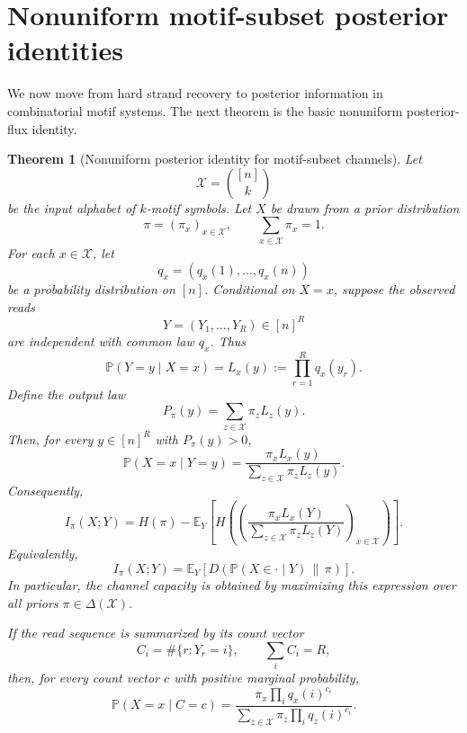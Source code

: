 \documentclass[11pt]{article}
\newtheorem{theorem}{Theorem}
\theoremstyle{definition}
\theoremstyle{remark}
\newcommand{\E}{\mathbb E}
\newcommand{\Pbb}{\mathbb P}
\newcommand{\1}{\mathbf 1}
\begin{document}
\section{Nonuniform motif-subset posterior identities}

We now move from hard strand recovery to posterior information in combinatorial motif systems.  The next theorem is the basic nonuniform posterior-flux identity.

\begin{theorem}[Nonuniform posterior identity for motif-subset channels]\label{thm:posterior-identity}
Let
\[
  \mathcal X=\binom{[n]}{k}
\]
be the input alphabet of \(k\)-motif symbols.  Let \(X\) be drawn from a prior distribution
\[
  \pi=(\pi_x)_{x\in\mathcal X},\qquad \sum_{x\in\mathcal X}\pi_x=1.
\]
For each \(x\in\mathcal X\), let
\[
  q_x=(q_x(1),\ldots,q_x(n))
\]
be a probability distribution on \([n]\).  Conditional on \(X=x\), suppose the observed reads
\[
  Y=(Y_1,\ldots,Y_R)\in[n]^R
\]
are independent with common law \(q_x\).  Thus
\[
  \Pbb(Y=y\mid X=x)=L_x(y):=\prod_{r=1}^R q_x(y_r).
\]
Define the output law
\[
  P_\pi(y)=\sum_{z\in\mathcal X}\pi_z L_z(y).
\]
Then, for every \(y\in[n]^R\) with \(P_\pi(y)>0\),
\[
  \Pbb(X=x\mid Y=y)=
  \frac{\pi_x L_x(y)}{\sum_{z\in\mathcal X}\pi_z L_z(y)}.
\]
Consequently,
\[
  I_\pi(X;Y)
  =H(\pi)-\E_Y\left[
    H\left(
      \left(
      \frac{\pi_xL_x(Y)}{\sum_{z\in\mathcal X}\pi_zL_z(Y)}
      \right)_{x\in\mathcal X}
    \right)
  \right].
\]
Equivalently,
\[
  I_\pi(X;Y)
  =\E_Y\left[
    D\left(\Pbb(X\in\cdot\mid Y)\,\middle\|\,\pi\right)
  \right].
\]
In particular, the channel capacity is obtained by maximizing this expression over all priors \(\pi\in\Delta(\mathcal X)\).

If the read sequence is summarized by its count vector
\[
  C_i=\#\{r:Y_r=i\},\qquad \sum_i C_i=R,
\]
then, for every count vector \(c\) with positive marginal probability,
\[
  \Pbb(X=x\mid C=c)=
  \frac{\pi_x\prod_i q_x(i)^{c_i}}
       {\sum_{z\in\mathcal X}\pi_z\prod_i q_z(i)^{c_i}}.
\]
\end{theorem}
\end{document}
